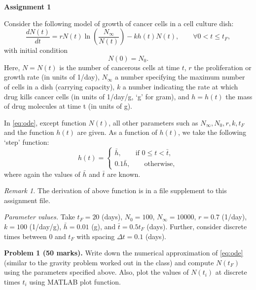 \documentclass[12pt,a4paper]{report}
\begin{document}
\begin{center} 
\textbf{Assignment 1} 
\end{center}

Consider the following model of growth of cancer cells in a cell culture dish:
\begin{equation}\label{eq:ode}
\frac{d N(t)}{d t} = r N(t) \ln\left(\frac{N_\infty}{N(t)}\right) - k h(t) N(t), \qquad \forall 0 < t \leq t_F,
\end{equation}
with initial condition
\begin{equation}
N(0) = N_0 .
\end{equation}
Here, $N = N(t)$ is the number of cancerous cells at time $t$, $r$ the proliferation or growth rate (in units of 1/day), $N_\infty$ a number specifying the maximum number of cells in a dish (carrying capacity), $k$ a number indicating the rate at which drug kills cancer cells (in units of 1/day/g, `g' for gram), and $h = h(t)$ the mass of drug molecules at time t (in units of g). 

In \eqref{eq:ode}, except function $N(t)$, all other parameters such as $N_\infty, N_0, r, k, t_F$ and the function $h(t)$ are given. As a function of $h(t)$, we take  the following `step' function:
\begin{equation}\label{eq:step}
h(t) = \begin{cases}
\bar{h}, \qquad \text{if } 0\leq t < \bar{t}, \\
0.1\bar{h}, \qquad \text{otherwise} ,
\end{cases}
\end{equation}
where again the values of $\bar{h}$ and $\bar{t}$ are known.

\textit{Remark 1.} The derivation of above function is in a file supplement to this assignment file. 

\textit{Parameter values.} Take $t_F = 20 $ (days), $N_0 = 100$, $N_\infty = 10000$, $r = 0.7$ (1/day), $k = 100$ (1/day/g), $\bar{h} = 0.01$ (g), and $\bar{t} = 0.5t_F$ (days). Further, consider discrete times between $0$ and $t_F$ with spacing $\Delta t = 0.1$ (days). 

\vspace{10pt}

\textbf{Problem 1 (50 marks).} Write down the numerical approximation of \eqref{eq:ode} (similar to the gravity problem worked out in the class) and 
compute $N(t_F)$ using the parameters specified above. Also, plot the values of $N(t_i)$ at discrete times $t_i$ using MATLAB plot function. 
\end{document}
